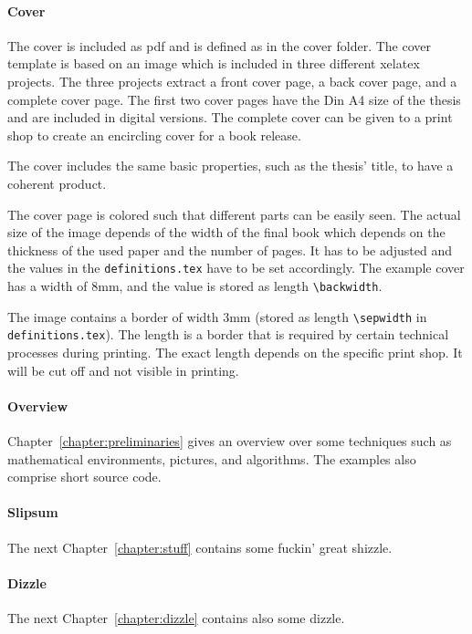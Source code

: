 \paragraph{Cover}
The cover is included as pdf and is defined as in the cover folder. The cover template is based on an image which is included in three different xelatex projects. The three projects extract a front cover page, a back cover page, and a complete cover page. The first two cover pages have the Din A4 size of the thesis and are included in digital versions. The complete cover can be given to a print shop to create an encircling cover for a book release.

The cover includes the same basic properties, such as the thesis' title, to have a coherent product.

The cover page is colored such that different parts can be easily seen. The actual size of the image depends of the width of the final book which depends on the thickness of the used paper and the number of pages. It has to be adjusted and the values in the \texttt{definitions.tex} have to be set accordingly. The example cover has a width of 8mm, and the value is stored as length \lstinline{\backwidth}.

The image contains a border of width 3mm (stored as length \lstinline{\sepwidth} in \texttt{definitions.tex}). The length is a border that is required by certain technical processes during printing. The exact length depends on the specific print shop. It will be cut off and not visible in printing.

\paragraph{Overview}
Chapter~\ref{chapter:preliminaries} gives an overview over some techniques such as mathematical environments, pictures, and algorithms. The examples also comprise short source code.

\paragraph{Slipsum}
The next Chapter~\ref{chapter:stuff} contains some fuckin' great shizzle.

\paragraph{Dizzle}
The next Chapter~\ref{chapter:dizzle} contains also some dizzle.
